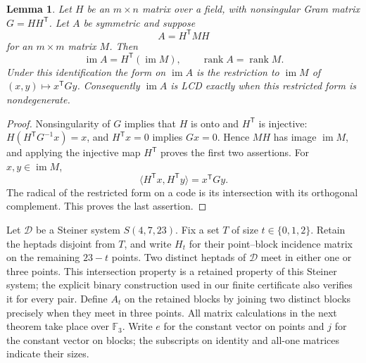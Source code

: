 \documentclass[11pt,a4paper]{article}
\newtheorem{lemma}[theorem]{Lemma}
\numberwithin{equation}{section}
\newcommand{\im}{\operatorname{im}}
\newcommand{\rank}{\operatorname{rank}}
\begin{document}
\begin{lemma}\label{ULCD.IncidenceTransfer}
Let $H$ be an $m\times n$ matrix over a field, with nonsingular Gram matrix
$G=HH^{\mathsf T}$. Let $A$ be symmetric and suppose
\[
 A=H^{\mathsf T}MH
\]
for an $m\times m$ matrix $M$. Then
\[
 \im A=H^{\mathsf T}(\im M),\qquad \rank A=\rank M.
\]
Under this identification the form on $\im A$ is the restriction to
$\im M$ of $(x,y)\mapsto x^{\mathsf T}Gy$.
Consequently $\im A$ is LCD exactly when this restricted form is
nondegenerate.
\end{lemma}
\begin{proof}
Nonsingularity of $G$ implies that $H$ is onto and $H^{\mathsf T}$ is
injective: $H(H^{\mathsf T}G^{-1}x)=x$, and $H^{\mathsf T}x=0$ implies
$Gx=0$. Hence $MH$ has image $\im M$, and applying the injective map
$H^{\mathsf T}$ proves the first two assertions. For $x,y\in\im M$,
\[
 \langle H^{\mathsf T}x,H^{\mathsf T}y\rangle=x^{\mathsf T}Gy.
\]
The radical of the restricted form on a code is its intersection with its
orthogonal complement. This proves the last assertion.
\end{proof}

Let $\mathcal D$ be a Steiner system $S(4,7,23)$. Fix a set $T$ of size
$t\in\{0,1,2\}$. Retain the heptads disjoint from $T$, and write
$H_t$ for their point--block incidence matrix on the remaining $23-t$
points. Two distinct heptads of $\mathcal D$ meet in either one or three
points. This intersection property is a retained property of this Steiner
system; the explicit binary construction used in our finite certificate
also verifies it for every pair. Define $A_t$ on the retained blocks by
joining two distinct blocks precisely when they meet in three points.
All matrix calculations in the next theorem take place over $\mathbb F_3$.
Write $e$ for the constant vector on points and $j$ for the constant vector
on blocks; the subscripts on identity and all-one matrices indicate their
sizes.
\end{document}
